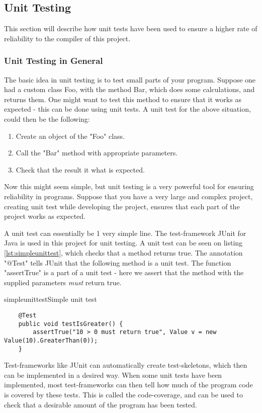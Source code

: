 \subsection{Unit Testing}
This section will describe how unit tests have been used to ensure a higher rate of reliability to the compiler of this project. 

\subsubsection{Unit Testing in General}
The basic idea in unit testing is to test small parts of your program. Suppose one had a custom class Foo, with the method Bar, which does some calculations, and returns them. One might want to test this method to ensure that it works as expected - this can be done using unit tests. A unit test for the above situation, could then be the following:
\begin{enumerate}
	\item Create an object of the "Foo" class.
	\item Call the "Bar" method with appropriate parameters. 
	\item Check that the result it what is expected.
\end{enumerate}
Now this might seem simple, but unit testing is a very powerful tool for ensuring reliability in programs. Suppose that you have a very large and complex project, creating unit test while developing the project, ensures that each part of the project works as expected.

A unit test can essentially be 1 very simple line. The test-framework JUnit for Java is used in this project for unit testing. A unit test can be seen on listing \ref{lst:simpleunittest}, which checks that a method returns true. The annotation "@Test" tells JUnit that the following method is a unit test. The function "assertTrue" is a part of a unit test - here we assert that the method with the supplied parameters \emph{must} return true.

\begin{code}{simpleunittest}{Simple unit test}
\begin{lstlisting}
	@Test
	public void testIsGreater() {
	    assertTrue("10 > 0 must return true", Value v = new Value(10).GreaterThan(0));
	}
\end{lstlisting}
\end{code}

Test-frameworks like JUnit can automatically create test-skeletons, which then can be implemented in a desired way. When some unit tests have been implemented, most test-frameworks can then tell how much of the program code is covered by these tests. This is called the code-coverage, and can be used to check that a desirable amount of the program has been tested.

